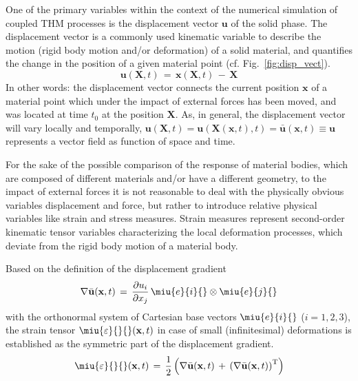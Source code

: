 One of the primary variables within the context of the numerical simulation of coupled THM processes is the displacement vector $\mathbf{u}$ of the solid phase. The displacement vector is a commonly used kinematic variable to describe the motion (rigid body motion and/or deformation) of a solid material, and quantifies the change in the position of a given material point (cf. Fig.~\ref{fig:disp_vect}).
\begin{equation}
\mathbf{u}(\mathbf{X},t)\,=\,\mathbf{x}(\mathbf{X},t)\,-\,\mathbf{X}
\label{eq:defvec}
\end{equation}
In other words: the displacement vector connects the current position $\mathbf{x}$ of a material point which under the impact of external forces has been moved, and was located at time $t_0$ at the position $\mathbf{X}$. As, in general, the displacement vector will vary locally and temporally, $\mathbf{u}(\mathbf{X},t)=\mathbf{u}(\mathbf{X}(\mathbf{x},t),t)=\bar{\mathbf{u}}(\mathbf{x}{}{},t)\equiv\mathbf{u}$ represents a vector field as function of space and time.

For the sake of the possible comparison of the response of material bodies, which are composed of different materials and/or have a different geometry, to the impact of external forces it is not reasonable to deal with the physically obvious variables displacement and force, but rather to introduce relative physical variables like strain and stress measures. Strain measures represent second-order kinematic tensor variables characterizing the local deformation processes, which deviate from the rigid body motion of a material body.

Based on the definition of the displacement gradient
\begin{equation}
\nabla{\bar{\mathbf{u}}}(\mathbf{x},t)\,=\,\frac{\partial u_i}{\partial x_j}\,\miu{e}{i}{}\otimes\miu{e}{j}{}
\label{eq:dispgrad}
\end{equation}
with the orthonormal system of Cartesian base vectors $\miu{e}{i}{}$ ($i=1,2,3$), the strain tensor $\miu{\varepsilon}{}{}(\mathbf{x},t)$ in case of small (infinitesimal) deformations is established as the symmetric part of the displacement gradient.
\begin{equation}
\miu{\varepsilon}{}{}(\mathbf{x},t)\,=\,\frac{1}{2}
\left(\nabla{\bar{\mathbf{u}}}(\mathbf{x},t)\,+\,\left(\nabla{\bar{\mathbf{u}}}(\mathbf{x},t)\right)^{\mathrm{T}}\right)
\label{eq:straintens}
\end{equation}

